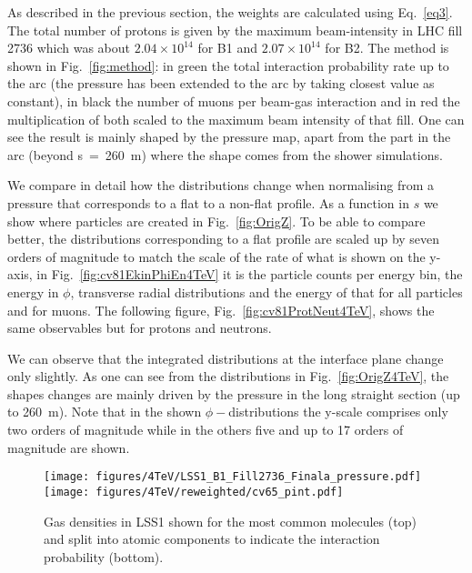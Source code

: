 As described in the previous section, the weights are calculated using Eq.~\ref{eq3}. The total number of protons is given by the maximum beam-intensity in LHC fill 2736 which was about $2.04 \times 10^{14}$ for B1 and $2.07 \times 10^{14}$ for B2. The method is shown in Fig.~\ref{fig:method}: in green the total interaction probability rate up to the arc (the pressure has been extended to the arc by taking closest value as constant), in black the number of muons per beam-gas interaction and in red the multiplication of both scaled to the maximum beam intensity of that fill. One can see the result is mainly shaped by the pressure map, apart from the part in the arc (beyond s~=~260~m) where the shape comes from the shower simulations. 

We compare in detail how the distributions change when normalising from a pressure that corresponds to a flat to a non-flat profile. As a function in $s$ we show where particles are created in Fig.~\ref{fig:OrigZ}. To be able to compare better, the distributions corresponding to a flat profile are scaled up by seven orders of magnitude to match the scale of the rate of what is shown on the y-axis, in Fig.~\ref{fig:cv81EkinPhiEn4TeV} it is the particle counts per energy bin, the energy in $\phi$, transverse radial distributions and the energy of that for all particles and for muons. The following figure, Fig.~\ref{fig:cv81ProtNeut4TeV}, shows the same observables but for protons and neutrons.

We can observe that the integrated distributions at the interface plane change only slightly. As one can see from the distributions in Fig.~\ref{fig:OrigZ4TeV}, the shapes changes are mainly driven by the pressure in the long straight section (up to 260~m). Note that in the shown $\phi-$distributions the y-scale comprises only two orders of magnitude while in the others five and up to 17 orders of magnitude are shown.

\begin{figure}%
\begin{center}
  \texttt{[image: figures/4TeV/LSS1\_B1\_Fill2736\_Finala\_pressure.pdf]}
  \texttt{[image: figures/4TeV/reweighted/cv65\_pint.pdf]}
\end{center}
\vspace{-0.6cm}
 \caption{Gas densities in LSS1 shown for the most common molecules (top) and split into atomic components to indicate the interaction probability (bottom).
  \label{pressure2012}}
\end{figure}

